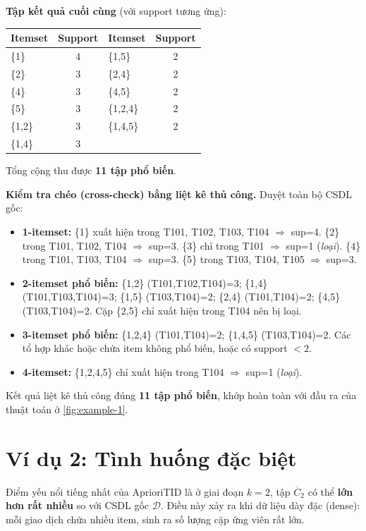 \textbf{Tập kết quả cuối cùng} (với support tương ứng):
\begin{center}
\begin{tabular}{|l|c||l|c|}
\hline
Itemset & Support & Itemset & Support \\ \hline
\{1\}     & 4 & \{1,5\}   & 2 \\
\{2\}     & 3 & \{2,4\}   & 2 \\
\{4\}     & 3 & \{4,5\}   & 2 \\
\{5\}     & 3 & \{1,2,4\} & 2 \\
\{1,2\}   & 3 & \{1,4,5\} & 2 \\
\{1,4\}   & 3 & & \\ \hline
\end{tabular}
\end{center}

Tổng cộng thu được \textbf{11 tập phổ biến}.

\textbf{Kiểm tra chéo (cross-check) bằng liệt kê thủ công.} Duyệt toàn bộ CSDL gốc:
\begin{itemize}[nosep,topsep=2pt]
    \item \textbf{1-itemset:} \{1\} xuất hiện trong T101, T102, T103, T104 $\Rightarrow$ sup=4. \{2\} trong T101, T102, T104 $\Rightarrow$ sup=3. \{3\} chỉ trong T101 $\Rightarrow$ sup=1 (\textit{loại}). \{4\} trong T101, T103, T104 $\Rightarrow$ sup=3. \{5\} trong T103, T104, T105 $\Rightarrow$ sup=3.
    \item \textbf{2-itemset phổ biến:} \{1,2\} (T101,T102,T104)=3; \{1,4\} (T101,T103,T104)=3; \{1,5\} (T103,T104)=2; \{2,4\} (T101,T104)=2; \{4,5\} (T103,T104)=2. Cặp \{2,5\} chỉ xuất hiện trong T104 nên bị loại.
    \item \textbf{3-itemset phổ biến:} \{1,2,4\} (T101,T104)=2; \{1,4,5\} (T103,T104)=2. Các tổ hợp khác hoặc chứa item không phổ biến, hoặc có support $<2$.
    \item \textbf{4-itemset:} \{1,2,4,5\} chỉ xuất hiện trong T104 $\Rightarrow$ sup=1 (\textit{loại}).
\end{itemize}
Kết quả liệt kê thủ công đúng \textbf{11 tập phổ biến}, khớp hoàn toàn với đầu ra của thuật toán ở \autoref{fig:example-1}.

\section{Ví dụ 2: Tình huống đặc biệt}

Điểm yếu nổi tiếng nhất của AprioriTID là ở giai đoạn $k=2$, tập $\overline{C}_2$ có thể \textbf{lớn hơn rất nhiều} so với CSDL gốc $\mathcal{D}$. Điều này xảy ra khi dữ liệu dày đặc (dense): mỗi giao dịch chứa nhiều item, sinh ra số lượng cặp ứng viên rất lớn.

